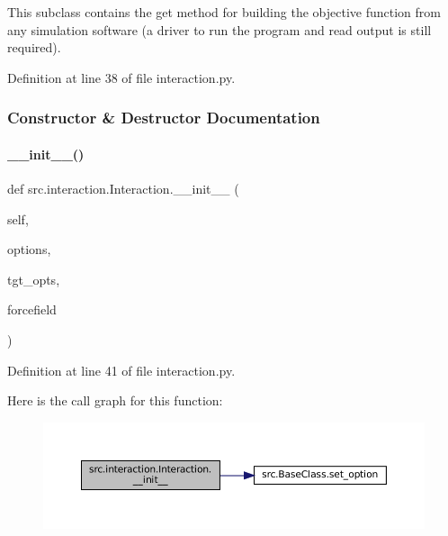 This subclass contains the \textquotesingle{}get\textquotesingle{} method for building the objective function from any simulation software (a driver to run the program and read output is still required). 

Definition at line 38 of file interaction.\+py.



\subsubsection{Constructor \& Destructor Documentation}
\mbox{\label{classsrc_1_1interaction_1_1Interaction_a1d02c0274fb07297a75a21195abcfa1f}} 
\paragraph{\texorpdfstring{\+\_\+\+\_\+init\+\_\+\+\_\+()}{\_\_init\_\_()}}
{\footnotesize\ttfamily def src.\+interaction.\+Interaction.\+\_\+\+\_\+init\+\_\+\+\_\+ (\begin{DoxyParamCaption}\item[{}]{self,  }\item[{}]{options,  }\item[{}]{tgt\+\_\+opts,  }\item[{}]{forcefield }\end{DoxyParamCaption})}



Definition at line 41 of file interaction.\+py.

Here is the call graph for this function\+:
\nopagebreak
\begin{figure}[H]
\begin{center}
\leavevmode
\includegraphics[width=350pt]{classsrc_1_1interaction_1_1Interaction_a1d02c0274fb07297a75a21195abcfa1f_cgraph}
\end{center}
\end{figure}


